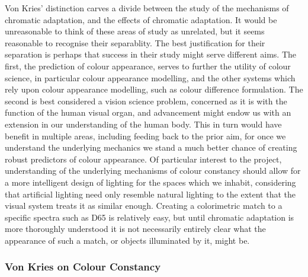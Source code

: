 Von Kries' distinction carves a divide between the study of the mechanisms of chromatic adaptation, and the effects of chromatic adaptation. It would be unreasonable to think of these areas of study as unrelated, but it seems reasonable to recognise their separablity. The best justification for their separation is perhaps that success in their study might serve different aims. The first, the prediction of colour appearance, serves to further the utility of colour science, in particular colour appearance modelling, and the other systems which rely upon colour appearance modelling, such as colour difference formulation. 
The second is best considered a vision science problem, concerned as it is with the function of the human visual organ, and advancement might endow us with an extension in our understanding of the human body. This in turn would have benefit in multiple areas, including feeding back to the prior aim, for once we understand the underlying mechanics we stand a much better chance of creating robust predictors of colour appearance. 
Of particular interest to the project, understanding of the underlying mechanisms of colour constancy should allow for a more intelligent design of lighting for the spaces which we inhabit, considering that artificial lighting need only resemble natural lighting to the extent that the visual system treats it as similar enough. Creating a colorimetric match to a specific spectra such as D65 is relatively easy, but until chromatic adaptation is more thoroughly understood it is not necessarily entirely clear what the appearance of such a match, or objects illuminated by it, might be. 

\subsubsection{Von Kries on Colour Constancy}

